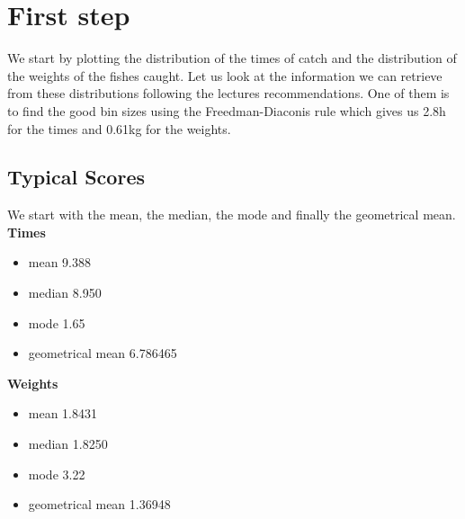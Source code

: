 \documentclass[12pt,twocolumn]{article} %
\begin{document}
\section{First step}
We start by plotting the distribution of the times of catch and the distribution of the weights of the fishes caught.
Let us look at the information we can retrieve from these distributions following the lectures recommendations. One of them  is to find the good bin sizes using the Freedman-Diaconis rule which gives us 2.8h for the times and 0.61kg for the weights.
\subsection{Typical Scores}
We start with the mean, the median, the mode and finally the geometrical mean.
\textbf{Times}
\begin{itemize}
\item mean 9.388
\item median 8.950
\item mode 1.65
\item geometrical mean 6.786465 
\end{itemize}
\textbf{Weights}
\begin{itemize}
\item mean 1.8431
\item median 1.8250
\item mode 3.22
\item geometrical mean 1.36948
\end{itemize}
\end{document}
